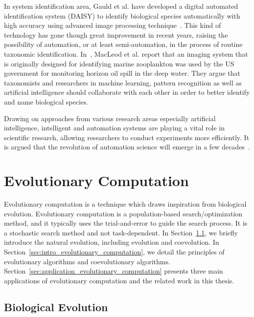 In system identification area, Gauld et al. have developed a digital automated identification system (DAISY) to identify biological species automatically with high accuracy using advanced image processing technique~\cite{Gauld_2000}. This kind of technology has gone though great improvement in recent years, raising the possibility of automation, or at least semi-automation, in the process of routine taxonomic identification. In~\cite{MacLeod_2010}, MacLeod et al. report that an imaging system that is originally designed for identifying marine zooplankton was used by the US government for monitoring horizon oil spill in the deep water. They argue that taxonomists and researchers in machine learning, pattern recognition as well as artificial intelligence should collaborate with each other in order to better identify and name biological species. 

Drawing on approaches from various research areas especially artificial intelligence, intelligent and automation systems are playing a vital role in scientific research, allowing researchers to conduct experiments more efficiently. It is argued that the revolution of automation science will emerge in a few decades~\cite{King_2009}.

\section{Evolutionary Computation}\label{sec:evolutionary_computation}

Evolutionary computation is a technique which draws inspiration from biological evolution. Evolutionary computation is a population-based search/optimization method, and it typically uses the trial-and-error to guide the search process. It is a stochastic search method and not task-dependent. In Section~\ref{sec:natural_evolution}, we briefly introduce the natural evolution, including evolution and coevolution. In Section~\ref{sec:intro_evolutionary_computation}, we detail the principles of evolutionary algorithms and coevolutionary algorithms. Section~\ref{sec:application_evolutionary_computation} presents three main applications of evolutionary computation and the related work in this thesis.

\subsection{Biological Evolution}\label{sec:natural_evolution}


